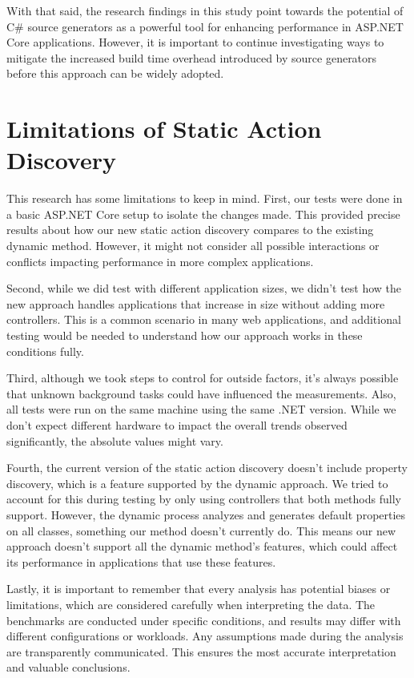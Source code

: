 With that said, the research findings in this study point towards the potential of C\# source generators as a powerful tool for enhancing performance in ASP.NET Core applications. However, it is important to continue investigating ways to mitigate the increased build time overhead introduced by source generators before this approach can be widely adopted.


\section{Limitations of Static Action Discovery}

This research has some limitations to keep in mind. First, our tests were done in a basic ASP.NET Core setup to isolate the changes made. This provided precise results about how our new static action discovery compares to the existing dynamic method. However, it might not consider all possible interactions or conflicts impacting performance in more complex applications.

Second, while we did test with different application sizes, we didn't test how the new approach handles applications that increase in size without adding more controllers. This is a common scenario in many web applications, and additional testing would be needed to understand how our approach works in these conditions fully.

Third, although we took steps to control for outside factors, it's always possible that unknown background tasks could have influenced the measurements. Also, all tests were run on the same machine using the same .NET version. While we don't expect different hardware to impact the overall trends observed significantly, the absolute values might vary.

Fourth, the current version of the static action discovery doesn't include property discovery, which is a feature supported by the dynamic approach. We tried to account for this during testing by only using controllers that both methods fully support. However, the dynamic process analyzes and generates default properties on all classes, something our method doesn't currently do. This means our new approach doesn't support all the dynamic method's features, which could affect its performance in applications that use these features.

Lastly, it is important to remember that every analysis has potential biases or limitations, which are considered carefully when interpreting the data. The benchmarks are conducted under specific conditions, and results may differ with different configurations or workloads. Any assumptions made during the analysis are transparently communicated. This ensures the most accurate interpretation and valuable conclusions.

